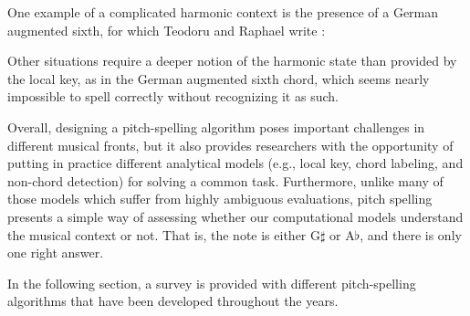 
One example of a complicated harmonic context is the
presence of a German augmented sixth, for which Teodoru and
Raphael write \parencite{teodoru2007pitch}:

\begin{italicquotes}
Other situations require a deeper notion of the harmonic
state than provided by the local key, as in the German
augmented sixth chord, which seems nearly impossible to
spell correctly without recognizing it as such.
\end{italicquotes}

Overall, designing a pitch-spelling algorithm poses
important challenges in different musical fronts, but it
also provides researchers with the opportunity of putting in
practice different analytical models (e.g., local key, chord
labeling, and non-chord detection) for solving a common
task. Furthermore, unlike many of those models which suffer
from highly ambiguous evaluations, pitch spelling presents a
simple way of assessing whether our computational models
understand the musical context or not. That is, the note is
either G$\sharp$ or A$\flat$, and there is only one right
answer.

In the following section, a survey is provided with
different pitch-spelling algorithms that have been developed
throughout the years.
